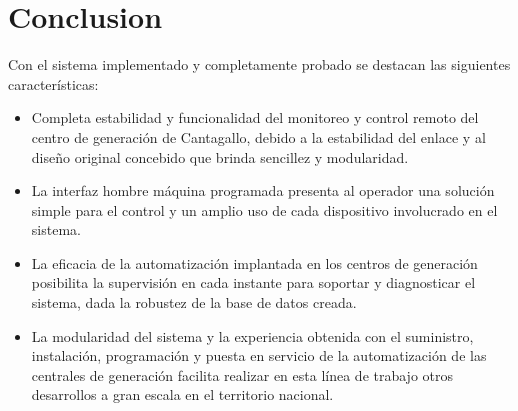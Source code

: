 
\section{Conclusion}

Con el sistema implementado y completamente probado se destacan las siguientes características:

\begin{itemize}
\item Completa estabilidad y funcionalidad del monitoreo y control remoto del centro de generación de Cantagallo, debido a la estabilidad del enlace y al diseño original concebido que brinda sencillez y modularidad.
\item La interfaz hombre máquina programada presenta al operador una solución simple para el control y un amplio uso de cada dispositivo involucrado en el sistema.
\item La eficacia de la automatización implantada en los centros de generación posibilita la supervisión en cada instante para soportar  y diagnosticar el sistema, dada la robustez de la base de datos creada.
\item La modularidad del sistema y la experiencia obtenida con el suministro, instalación, programación y puesta en servicio de la automatización de las centrales de generación facilita realizar en esta línea de trabajo otros desarrollos a gran escala en el territorio nacional.
\end{itemize}

